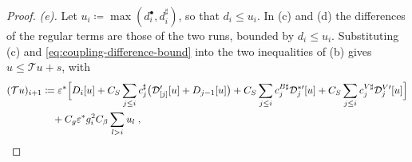 \documentclass[11pt]{preprint}
\numberwithin{equation}{section}
\theoremstyle{definition}
\theoremstyle{remark}
\theoremstyle{plain}
\begin{document}
\begin{proof}
\emph{(e).} Let $u_i \coloneqq \max(d^\bullet_i, d^\sharp_i)$, so that $d_i \leq u_i$. In (c) and (d) the differences of the regular terms are those of the two runs, bounded by $d_i \leq u_i$. Substituting (c) and \eqref{eq:coupling-difference-bound} into the two inequalities of (b) gives $u \leq \mathcal Tu + s$, with
\begin{equation}\label{eq:recursion-operator}
    \begin{split}
        (\mathcal Tu)_{i+1} &\coloneqq \varepsilon^*\Bigl[D_i[u] + C_S\sum_{j \leq i}c^\sharp_j\bigl(\mathcal D'_{[j]}[u] + D_{j-1}[u]\bigr) + C_S\sum_{j \leq i}c^{B\sharp}_j\mathcal D^{*\prime}_j[u] + C_S\sum_{j \leq i}c^{V\sharp}_j\mathcal D^{V\prime}_j[u]\Bigr]
        \\
        &\quad + C_g\varepsilon^*g_i^2C_\beta\sum_{l>i}u_l\;,
    \end{split}
\end{equation}

\end{proof}
\end{document}
